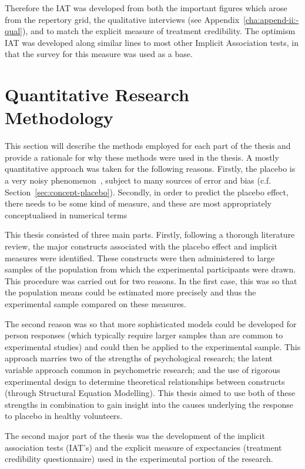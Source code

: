 Therefore the IAT was developed from both the important figures which arose from the repertory grid, the qualitative interviews (see Appendix~\ref{cha:append-ii:-qual}), and to match the explicit measure of treatment credibility. The optimism IAT was developed along similar lines to most other Implicit Association tests, in that the survey for this measure was used as a base. 


\section{Quantitative Research Methodology}
\label{sec:quant-rese-meth}
This section  will describe the methods employed for each part of the thesis and provide a rationale for why these methods were used in the thesis.
A mostly quantitative approach was taken for the following reasons. Firstly, the placebo  is a very noisy phenomenon~\cite{Singer2005}, subject to many sources of error and bias (c.f. Section~\ref{sec:concept-placebo}). Secondly, in order to predict the placebo effect, there needs to be some kind of measure, and these are most appropriately conceptualised in numerical terms

This thesis consisted of three main parts. Firstly, following a thorough literature review, the major constructs associated with the placebo effect and implicit measures were identified. These constructs were then administered to large samples of the population from which the experimental participants were drawn. This procedure was carried out for two reasons. In the first case, this was so that the population means could be estimated more precisely and thus the experimental sample compared on these measures.  

The second reason was so that more sophisticated models could be developed for person responses (which typically require larger samples than are common to experimental studies) and could then be applied to the experimental sample. This approach marries two of the strengths of psychological research; the latent variable approach common in psychometric research; and  the use of rigorous experimental design to determine theoretical relationships between constructs (through Structural Equation Modelling). This thesis aimed to use both of these strengths in combination to gain insight into the causes underlying the response to placebo in healthy volunteers.

The second major part of the thesis was the development of the implicit association tests (IAT's) and the explicit measure of expectancies (treatment credibility questionnaire) used in the experimental portion of the research. 

